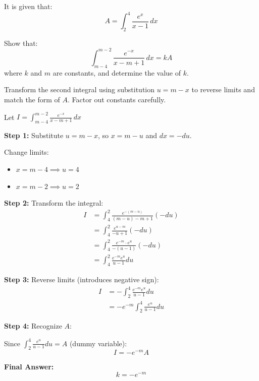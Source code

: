 \vspace{1.5cm}


\begin{problem}
It is given that:
\[
A = \int_{2}^{4} \frac{e^x}{x-1} \, dx
\]

Show that:
\[
\int_{m-4}^{m-2} \frac{e^{-x}}{x - m + 1} \, dx = kA
\]
where $k$ and $m$ are constants, and determine the value of $k$.
\end{problem}

\begin{hint}
Transform the second integral using substitution $u = m - x$ to reverse limits and match the form of $A$. Factor out constants carefully.
\end{hint}

\begin{solution}
Let $I = \int_{m-4}^{m-2} \frac{e^{-x}}{x - m + 1} \, dx$

\textbf{Step 1:} Substitute $u = m - x$, so $x = m - u$ and $dx = -du$.

Change limits:
\begin{itemize}
\item $x = m-4 \implies u = 4$
\item $x = m-2 \implies u = 2$
\end{itemize}

\textbf{Step 2:} Transform the integral:
\begin{align*}
I &= \int_{4}^{2} \frac{e^{-(m-u)}}{(m-u) - m + 1} (-du) \\
&= \int_{4}^{2} \frac{e^{u-m}}{-u + 1} (-du) \\
&= \int_{4}^{2} \frac{e^{-m} \cdot e^{u}}{-(u - 1)} (-du) \\
&= \int_{4}^{2} \frac{e^{-m} e^{u}}{u - 1} du
\end{align*}

\textbf{Step 3:} Reverse limits (introduces negative sign):
\begin{align*}
I &= -\int_{2}^{4} \frac{e^{-m} e^{u}}{u - 1} du \\
&= -e^{-m} \int_{2}^{4} \frac{e^{u}}{u - 1} du
\end{align*}

\textbf{Step 4:} Recognize $A$:

Since $\int_{2}^{4} \frac{e^{u}}{u - 1} du = A$ (dummy variable):
\[
I = -e^{-m} A
\]

\textbf{Final Answer:}
\[
\boxed{k = -e^{-m}}
\]
\end{solution}

